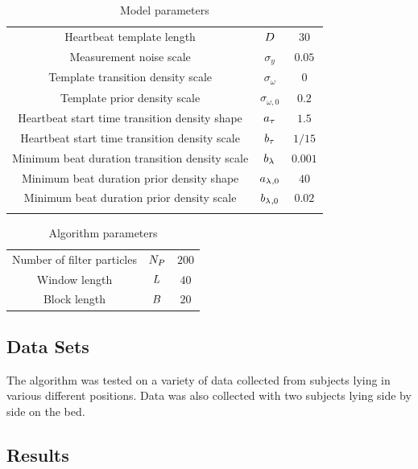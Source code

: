 \documentclass{article}
\begin{document}
\begin{table}[!ht]
\centering
\begin{tabular}{ccc}
 \\ \hline
 Heartbeat template length & $D$ & $30$ \\
 Measurement noise scale & $\sigma_y$ & $0.05$ \\
 Template transition density scale & $\sigma_{\omega}$ & $0$ \\
 Template prior density scale & $\sigma_{\omega,0}$ & $0.2$ \\
 Heartbeat start time transition density shape & $\gamshape{\hbst{}}$ & $1.5$ \\
 Heartbeat start time transition density scale & $\gamscale{\hbst{}}$ & $1/15$ \\
 Minimum beat duration transition density scale & $\gamscale{\hbmd{}}$ & $0.001$ \\
 Minimum beat duration prior density shape & $\gamshape{\hbmd{},0}$ & $40$ \\
 Minimum beat duration prior density scale & $\gamscale{\hbmd{},0}$ & $0.02$ \\
 \hline \\
\end{tabular}
\caption{Model parameters}
\label{tab:model_parameters}
\end{table}

\begin{table}[!ht]
\centering
\begin{tabular}{ccc}
 \\ \hline
 Number of filter particles & $N_P$ & $200$ \\
 Window length & $L$ & $40$ \\
 Block length & $B$ & $20$ \\
 \hline
\end{tabular}
\caption{Algorithm parameters}
\label{tab:algorithm_parameters}
\end{table}

\subsection{Data Sets}

The algorithm was tested on a variety of data collected from subjects lying in various different positions. Data was also collected with two subjects lying side by side on the bed.

\subsection{Results}
\end{document}
